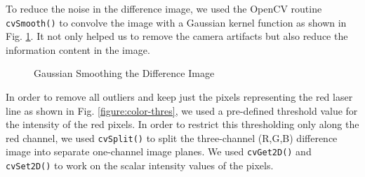 To reduce the noise in the difference image, we used the OpenCV
routine \texttt{cvSmooth()} to convolve the image with a Gaussian kernel
function as shown in Fig. \ref{figure:gauss}. It not only helped us to
remove the camera artifacts but also reduce the information content in the
image.

\begin{figure}[ht!]
\centering
{} \quad
{} \hfill
\caption{Gaussian Smoothing the Difference Image}
\label{figure:gauss}
\end{figure}

In order to remove all outliers and keep just the pixels
representing the red laser line as shown in Fig. \ref{figure:color-thres},
we used a pre-defined threshold value for the intensity of the red pixels. In
order to restrict this thresholding only along the red channel, we used
\texttt{cvSplit()} to split the three-channel (R,G,B) difference image into
separate one-channel image planes. We used \texttt{cvGet2D()} and
\texttt{cvSet2D()} to work on the scalar intensity values of the pixels.

